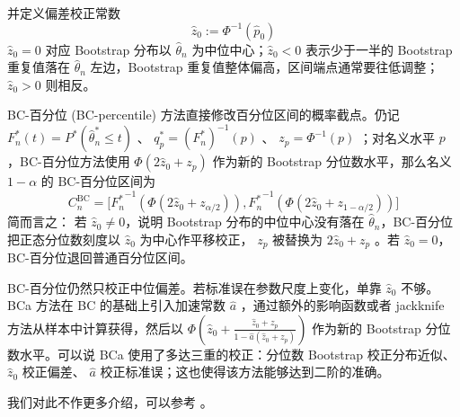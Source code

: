 并定义偏差校正常数
\[\widehat z_0:=\Phi^{-1}(\widehat p_0)\]
$\widehat z_0=0$ 对应 Bootstrap 分布以 $\widehat\theta_n$ 为中位中心；$\widehat z_0<0$ 表示少于一半的 Bootstrap 重复值落在 $\widehat\theta_n$ 左边，Bootstrap 重复值整体偏高，区间端点通常要往低调整；$\widehat z_0>0$ 则相反。

BC-百分位 (BC-percentile) 方法直接修改百分位区间的概率截点。仍记 $F_n^*(t)=P^*(\widehat\theta_n^*\le t)$ 、 $q_p^*=(F_n^*)^{-1}(p)$ 、 $z_p=\Phi^{-1}(p)$ ；对名义水平 $p$ ，BC-百分位方法使用 $\Phi(2\widehat z_0+z_{p})$ 作为新的 Bootstrap 分位数水平，那么名义 $1-\alpha$ 的 BC-百分位区间为
\[C_n^{\text{BC}}=\Big[{F_n^*}^{-1}(\Phi(2\widehat z_0+z_{\alpha/2})),{F_n^*}^{-1}(\Phi(2\widehat z_0+z_{1-\alpha/2}))\Big]\]
简而言之： 若 $\widehat z_0\ne0$，说明 Bootstrap 分布的中位中心没有落在 $\widehat\theta_n$，BC-百分位把正态分位数刻度以 $\widehat z_0$ 为中心作平移校正， $z_p$ 被替换为 $2\widehat z_0+z_p$ 。若 $\widehat z_0=0$，BC-百分位退回普通百分位区间。

BC-百分位仍然只校正中位偏差。若标准误在参数尺度上变化，单靠 $\widehat z_0$ 不够。BCa 方法在 BC 的基础上引入加速常数 $\widehat a$ ，通过额外的影响函数或者 jackknife 方法从样本中计算获得，然后以 $\Phi\left( \widehat z_0+ \frac{\widehat z_0+z_p} {1-\widehat a(\widehat z_0+z_p)} \right)$ 作为新的 Bootstrap 分位数水平。可以说 BCa 使用了多达三重的校正：分位数 Bootstrap 校正分布近似、 $\widehat z_0$ 校正偏差、 $\widehat a$ 校正标准误；这也使得该方法能够达到二阶的准确。

我们对此不作更多介绍，可以参考 \cite{efron1987}。

